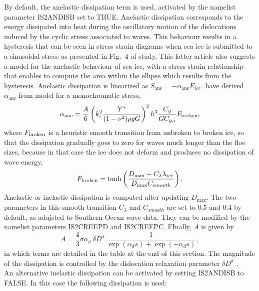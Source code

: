By default, the anelastic dissipation term is used, activated by the namelist parameter {\code IS2ANDISB} set to {\code TRUE}. 
Anelastic dissipation corresponds to the energy dissipated into heat during the oscillatory motion of the dislocations induced by the cyclic stress associated to waves.  This behaviour results in a hysteresis that can be seen in stress-strain diagrams when sea ice is submitted to a sinusoidal stress as presented in Fig.~4 of \cite{art:Cea98} study. This latter article also suggests a model for the anelastic behaviour of sea ice, with a stress-strain relationship that enables to compute the area within the ellipse which results from the hysteresis. Anelastic dissipation is linearized as  $S_{\mathrm{ane}}=-\alpha_{\mathrm{ane}} E_{ice}$. 
\cite{art:Bea18} have derived  $\alpha_{\mathrm{ane}}$  from \cite{art:Cea98} model for a monochromatic stress, 
\begin{equation}
\alpha_{\mathrm{ane}}= \dfrac{A}{6}\left(k_i^{2}\dfrac{Y^*}{(1-\nu^{2})\rho gG}\right)^{2}h^{3}\frac{C_g}{GC_{g,i}} F_{\rm broken},
\label{eq:alpha_ane}
\end{equation}  
where $F_{\rm broken}$  is a heuristic smooth transition from unbroken to broken ice, so that the dissipation 
gradually goes to zero for waves much longer than the floe sizes, because in that case the ice does 
not deform and produces no dissipation of wave energy, 
\begin{equation}
F_{\rm broken}=\tanh \left( {\frac{D_{\max}-C_{\lambda}\lambda_{ice}} {D_{\max}C_{smooth} } }\right).
\label{smooth}
\end{equation}
Anelastic or inelastic dissipation is computed after updating $D_{\max}$. 
The two parameters in this smooth transition $C_{\lambda}$ and $C_{smooth}$ are 
set to  $0.5$ and $0.4$ by default, as adujsted to Southern Ocean wave data. They can be modified by the namelist parameters {\code IS2CREEPD} and {\code IS2CREEPC}.
FInally,  $A$ is given by 
\begin{equation}
A=\dfrac{4}{3}\sigma \alpha_{d}~\delta D^{d}~\dfrac{1}{\exp(\alpha_{d}s)+\exp(-\alpha_{d}s)}, 
\label{eq:A_ane}
\end{equation}  
in which terms are detailed in the table at the end of this section. The magnitude of the dissipation is controlled by the dislocation relaxation parameter $\delta D^{d}$ .\\


An alternative inelastic dissipation can be activated by setting {\code IS2ANDISB} to {\code FALSE}. In this case the following dissipation is used: 

